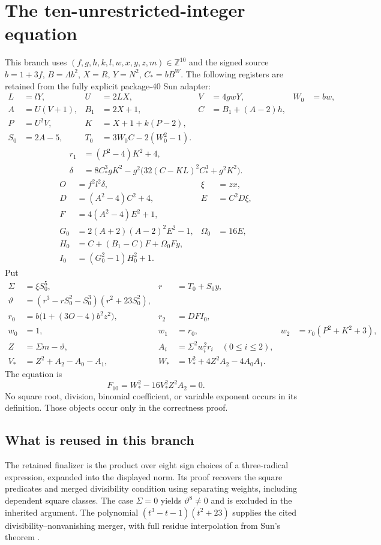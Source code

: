 \documentclass[11pt]{article}
\newcommand{\Z}{\mathbb Z}
\theoremstyle{definition}\newtheorem{definition}[theorem]{Definition}
\theoremstyle{remark}\newtheorem{remark}[theorem]{Remark}
\begin{document}
\section{The ten-unrestricted-integer equation}
\label{sec:ten}
This branch uses $(f,g,h,k,l,w,x,y,z,m)\in\Z^{10}$ and the signed
source $b=1+3f$, $B=\Lambda b^2$, $X=R$, $Y=N^2$, $C_*=bB^W$.
The following registers are retained from the fully explicit package-40
Sun adapter:
\begin{align*}
 L&=lY, &U&=2LX, &V&=4gwY, &W_0&=bw,\\
 A&=U(V+1), &B_1&=2X+1, &C&=B_1+(A-2)h,\\
 P&=U^2V, &K&=X+1+k(P-2),\\
 S_0&=2A-5, &T_0&=3W_0C-2(W_0^2-1).
\end{align*}
\begin{align*}
 r_1&=(P^2-4)K^2+4,\\
 \delta&=8C_*^3gK^2-g^2\bigl(32(C-KL)^2C_*^3+g^2K^2\bigr).
\end{align*}
\begin{align*}
 O&=f^2l^2\delta, &\xi&=zx,\\
 D&=(A^2-4)C^2+4, &E&=C^2D\xi,\\
 F&=4(A^2-4)E^2+1,\\
 G_0&=2(A+2)(A-2)^2E^2-1, &\Omega_0&=16E,\\
 H_0&=C+(B_1-C)F+\Omega_0Fy,\\
 I_0&=(G_0^2-1)H_0^2+1.
\end{align*}
Put
\begin{align*}
 \Sigma&=\xi S_0^5,& r&=T_0+S_0y,\\
 \vartheta&=(r^3-rS_0^2-S_0^3)(r^2+23S_0^2),\\
 r_0&=b\bigl(1+(3O-4)b^2z^2\bigr),&r_2&=DFI_0,\\
 w_0&=1,&w_1&=r_0,&w_2&=r_0(P^2+K^2+3),\\
 Z&=\Sigma m-\vartheta,&A_i&=\Sigma^2w_i^2r_i\quad(0\le i\le2),\\
 V_*&=Z^2+A_2-A_0-A_1,&
 W_*&=V_*^2+4Z^2A_2-4A_0A_1.
\end{align*}
The equation is
\begin{equation}\label{eq:ten}
 \boxed{F_{10}=W_*^2-16V_*^2Z^2A_2=0.}
\end{equation}
No square root, division, binomial coefficient, or variable exponent occurs
in its definition. Those objects occur only in the correctness proof.

\subsection{What is reused in this branch}
The retained finalizer is the product over eight sign choices of a
three-radical expression, expanded into the displayed norm. Its proof
recovers the square predicates and merged divisibility condition using
separating weights, including dependent square classes. The case
$\Sigma=0$ yields $\vartheta^8\ne0$ and is excluded in the inherited
argument. The polynomial $(t^3-t-1)(t^2+23)$ supplies the cited
divisibility--nonvanishing merger, with full residue interpolation from
Sun's theorem \cite{sun,package40}.
\end{document}
